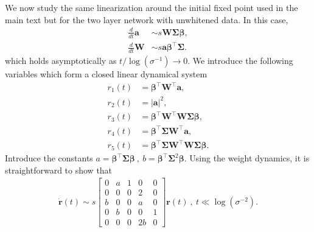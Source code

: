 \documentclass{article} %
\begin{document}
\begin{appendix}
We now study the same linearization around the initial fixed point used in the main text but for the two layer network with unwhitened data. In this case,
\begin{align}
    \frac{d}{dt} \bm a  &\sim s \bm W \bm\Sigma \bm\beta,
    \\
    \frac{d}{dt} \bm W &\sim s \bm a \bm \beta^\top \bm\Sigma.
\end{align}
which holds asymptotically as $t / \log(\sigma^{-1})  \to 0$.
We introduce the following variables which form a closed linear dynamical system
\begin{equation}
\begin{aligned}
    r_1(t) &= \bm \beta^\top \bm W^\top \bm a ,
    \\
    r_2(t) &= |\bm a|^2 ,
    \\
    r_3(t) &= \bm \beta^\top \bm W^\top \bm W \bm \Sigma \bm \beta  ,
    \\
    r_4(t) &= \bm \beta^\top \bm\Sigma \bm W^\top \bm a ,
    \\
    r_5(t) &= \bm\beta^\top \bm \Sigma \bm W^\top \bm W \bm \Sigma \bm \beta.
\end{aligned}
\end{equation}
Introduce the constants $a = \bm\beta^\top \bm \Sigma \bm\beta \ , \ b = \bm\beta^\top \bm\Sigma^2 \bm\beta$. Using the weight dynamics, it is straightforward to show that
\begin{align}
    \dot{\bm r}(t) \sim s \begin{bmatrix}
    0 & a & 1 & 0 & 0 \\
    0 & 0 & 0 & 2 & 0 \\
    b & 0 & 0 & a & 0 \\
    0 & b & 0 & 0 & 1 \\
    0 & 0 & 0 & 2b & 0
    \end{bmatrix} \bm r(t) \ , \ t \ll \log( \sigma^{-2} ).
\end{align}


\end{appendix}
\end{document}
